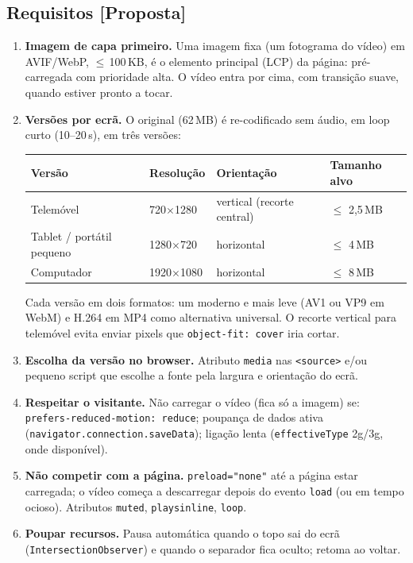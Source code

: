 \documentclass[11pt,a4paper]{article}
\newcommand{\proposta}{\textcolor{bronze}{\textbf{[Proposta]}}}
\begin{document}
\subsection{Requisitos \proposta}
\begin{enumerate}
  \item \textbf{Imagem de capa primeiro.} Uma imagem fixa (um fotograma do vídeo) em AVIF/WebP, $\leq$\,100\,KB, é o elemento principal (LCP) da página: pré-carregada com prioridade alta. O vídeo entra por cima, com transição suave, quando estiver pronto a tocar.
  \item \textbf{Versões por ecrã.} O original (62\,MB) é re-codificado sem áudio, em loop curto (10--20\,s), em três versões:
  \begin{center}
  \begin{tabular}{llll}
  \toprule
  \textbf{Versão} & \textbf{Resolução} & \textbf{Orientação} & \textbf{Tamanho alvo} \\
  \midrule
  Telemóvel & 720$\times$1280 & vertical (recorte central) & $\leq$ 2,5\,MB \\
  Tablet / portátil pequeno & 1280$\times$720 & horizontal & $\leq$ 4\,MB \\
  Computador & 1920$\times$1080 & horizontal & $\leq$ 8\,MB \\
  \bottomrule
  \end{tabular}
  \end{center}
  Cada versão em dois formatos: um moderno e mais leve (AV1 ou VP9 em WebM) e H.264 em MP4 como alternativa universal. O recorte vertical para telemóvel evita enviar pixels que \texttt{object-fit: cover} iria cortar.
  \item \textbf{Escolha da versão no browser.} Atributo \texttt{media} nas \texttt{<source>} e/ou pequeno script que escolhe a fonte pela largura e orientação do ecrã.
  \item \textbf{Respeitar o visitante.} Não carregar o vídeo (fica só a imagem) se: \texttt{prefers-reduced-motion: reduce}; poupança de dados ativa (\texttt{navigator.connection.saveData}); ligação lenta (\texttt{effectiveType} 2g/3g, onde disponível).
  \item \textbf{Não competir com a página.} \texttt{preload="none"} até a página estar carregada; o vídeo começa a descarregar depois do evento \texttt{load} (ou em tempo ocioso). Atributos \texttt{muted}, \texttt{playsinline}, \texttt{loop}.
  \item \textbf{Poupar recursos.} Pausa automática quando o topo sai do ecrã (\texttt{IntersectionObserver}) e quando o separador fica oculto; retoma ao voltar.

\end{enumerate}
\end{document}
